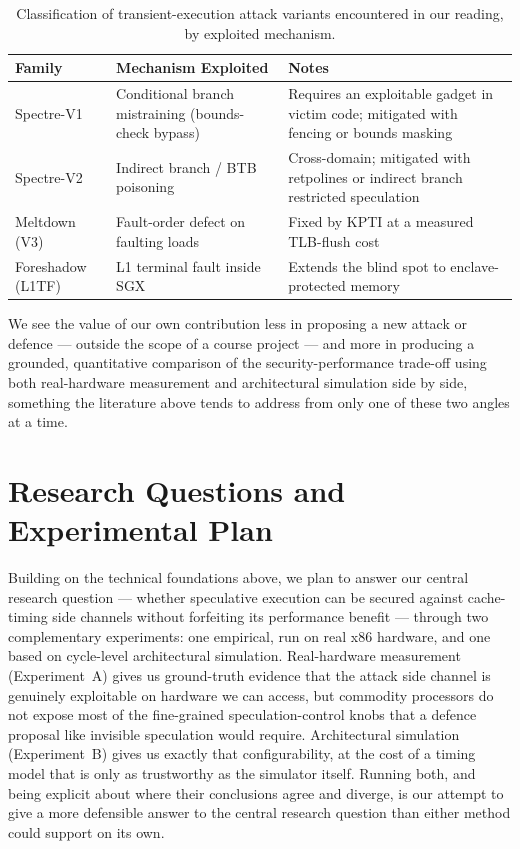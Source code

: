 \documentclass[11pt,a4paper]{article}
\begin{document}
\begin{table}[h]
\centering
\begin{tabular}{@{}p{2.6cm}p{4.6cm}p{5.6cm}@{}}
\toprule
\textbf{Family} & \textbf{Mechanism Exploited} & \textbf{Notes} \\
\midrule
Spectre-V1 & Conditional branch mistraining (bounds-check bypass) & Requires an exploitable gadget in victim code; mitigated with fencing or bounds masking \\
\addlinespace
Spectre-V2 & Indirect branch / BTB poisoning & Cross-domain; mitigated with retpolines or indirect branch restricted speculation \\
\addlinespace
Meltdown (V3) & Fault-order defect on faulting loads & Fixed by KPTI at a measured TLB-flush cost \\
\addlinespace
Foreshadow (L1TF) & L1 terminal fault inside SGX & Extends the blind spot to enclave-protected memory \\
\bottomrule
\end{tabular}
\caption{Classification of transient-execution attack variants encountered
in our reading, by exploited mechanism.}
\label{tab:variants}
\end{table}

We see the value of our own contribution less in proposing a new attack or
defence --- outside the scope of a course project --- and more in producing a
grounded, quantitative comparison of the security-performance trade-off using
both real-hardware measurement and architectural simulation side by side,
something the literature above tends to address from only one of these two
angles at a time.

\clearpage

\section{Research Questions and Experimental Plan}
\label{sec:exp}

Building on the technical foundations above, we plan to answer our central
research question --- whether speculative execution can be secured against
cache-timing side channels without forfeiting its performance benefit ---
through two complementary experiments: one empirical, run on real x86
hardware, and one based on cycle-level architectural simulation. Real-hardware
measurement (Experiment~A) gives us ground-truth evidence that the attack side
channel is genuinely exploitable on hardware we can access, but commodity
processors do not expose most of the fine-grained speculation-control knobs
that a defence proposal like invisible speculation would require. Architectural
simulation (Experiment~B) gives us exactly that configurability, at the cost of
a timing model that is only as trustworthy as the simulator itself. Running
both, and being explicit about where their conclusions agree and diverge, is
our attempt to give a more defensible answer to the central research question
than either method could support on its own.
\end{document}

